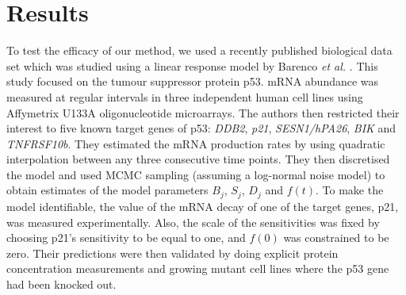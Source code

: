 \documentclass[english]{article}
\begin{document}
\section{Results}
To test the efficacy of our method, we used a recently published biological
data set which was studied using a linear response model by Barenco 
\emph{et al.} \cite{Barenco:ranked06}. This study focused on 
the tumour suppressor protein p53. mRNA abundance was measured at regular 
intervals in three independent human cell lines using Affymetrix
U133A oligonucleotide microarrays. 
The authors then restricted their interest to five known target genes of p53: 
\emph{DDB2}, \emph{p21}, \emph{SESN1/hPA26}, \emph{BIK} and \emph{TNFRSF10b}. 
They estimated the  mRNA production rates by using quadratic interpolation
between any three consecutive time points. They then discretised the model
and used MCMC sampling (assuming a log-normal noise model) to obtain estimates 
of the model parameters $B_j$, $S_j$, $D_j$ and $f(t)$. To make the model
identifiable, the value of
the mRNA decay of one of the target genes, p21, was measured experimentally. 
Also, the scale of the sensitivities was fixed by choosing p21's sensitivity to
be equal to one, and $f(0)$ was constrained to be zero. 
Their predictions were then validated by doing explicit
protein concentration measurements and growing mutant cell lines where 
the p53 gene had been knocked out.
\end{document}
